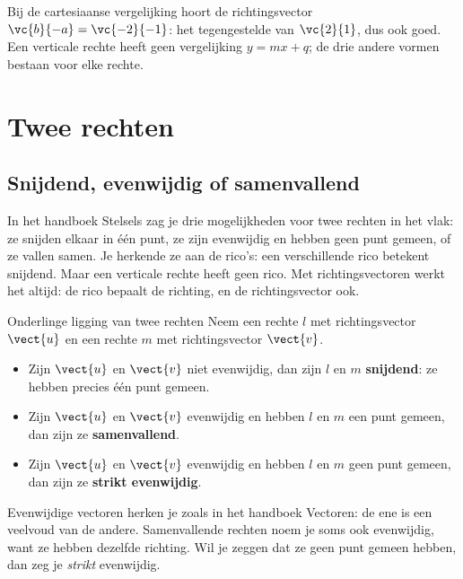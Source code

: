 Bij de cartesiaanse vergelijking hoort de richtingsvector $\vc{b}{-a} = \vc{-2}{-1}$: het tegengestelde van $\vc{2}{1}$, dus ook goed. Een verticale rechte heeft geen vergelijking $y = mx + q$; de drie andere vormen bestaan voor elke rechte.

\section{Twee rechten}

\subsection{Snijdend, evenwijdig of samenvallend}

In het handboek Stelsels zag je drie mogelijkheden voor twee rechten in het vlak: ze snijden elkaar in één punt, ze zijn evenwijdig en hebben geen punt gemeen, of ze vallen samen. Je herkende ze aan de rico's: een verschillende rico betekent snijdend. Maar een verticale rechte heeft geen rico. Met richtingsvectoren werkt het altijd: de rico bepaalt de richting, en de richtingsvector ook.

\begin{theorie}
\begin{stelling}{Onderlinge ligging van twee rechten}
Neem een rechte $l$ met richtingsvector $\vect{u}$ en een rechte $m$ met richtingsvector $\vect{v}$.
\begin{itemize}[nosep,leftmargin=5mm]
\item Zijn $\vect{u}$ en $\vect{v}$ niet evenwijdig, dan zijn $l$ en $m$ \textbf{\textcolor{accent}{snijdend}}: ze hebben precies één punt gemeen.
\item Zijn $\vect{u}$ en $\vect{v}$ evenwijdig en hebben $l$ en $m$ een punt gemeen, dan zijn ze \textbf{\textcolor{accent}{samenvallend}}.
\item Zijn $\vect{u}$ en $\vect{v}$ evenwijdig en hebben $l$ en $m$ geen punt gemeen, dan zijn ze \textbf{\textcolor{accent}{strikt evenwijdig}}.
\end{itemize}
\end{stelling}
\end{theorie}

Evenwijdige vectoren herken je zoals in het handboek Vectoren: de ene is een veelvoud van de andere. Samenvallende rechten noem je soms ook evenwijdig, want ze hebben dezelfde richting. Wil je zeggen dat ze geen punt gemeen hebben, dan zeg je \textit{strikt} evenwijdig.

